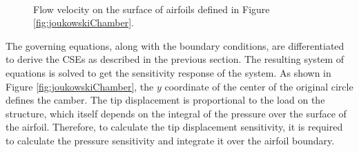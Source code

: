 \documentclass[12pt]{aiaa-pretty}
\begin{document}
%
	\begin{figure}[H]
		\centering
		\quad
		\\
		\quad
		\caption{Flow velocity on the surface of airfoils defined in Figure \ref{fig:joukowskiChamber}.}
		\label{fig:airfoilSurfaceVelocity}
	\end{figure}
%

The governing equations, along with the boundary conditions, are differentiated to derive the CSEs as described in the previous section. The resulting system of equations is solved to get the sensitivity response of the system. As shown in Figure \ref{fig:joukowskiChamber}, the $y$ coordinate of the center of the original circle defines the camber. The tip displacement is proportional to the load on the structure, which itself depends on the integral of the pressure over the surface of the airfoil. Therefore, to calculate the tip displacement sensitivity, it is required to calculate the pressure sensitivity and integrate it over the airfoil boundary.
\end{document}
